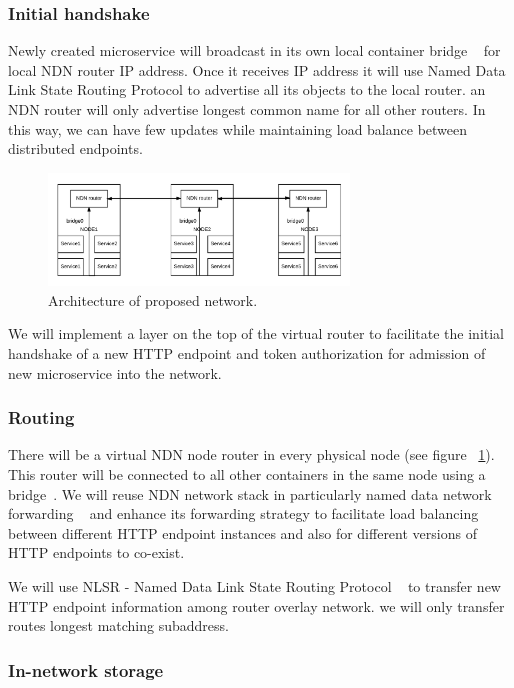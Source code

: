 \subsubsection{Initial handshake}

Newly created microservice will broadcast in its own local container bridge ~\cite{DockerNet} for local NDN router IP address. Once it receives IP address it will use Named Data Link State Routing Protocol to advertise all its objects to the local router. an NDN router will only advertise longest common name for all other routers. In this way, we can have few updates while maintaining load balance between distributed endpoints.

\begin{figure}
   \includegraphics[height=3cm, width=8cm]{figs/structural_diagram}
   \caption{Architecture of proposed network.}
   \label{fig:networkmodel}
\end{figure}

We will implement a layer on the top of the virtual router to facilitate the initial handshake of a new HTTP endpoint and token authorization for admission of new microservice into the network.

\subsubsection{Routing}

There will be a virtual NDN node router in every physical node (see figure ~\ref{fig:networkmodel}). This router will be connected to all other containers in the same node using a bridge~\cite{DockerNet}. We will reuse NDN network stack in particularly named data network forwarding ~\cite{yuan2012scalable} and enhance its forwarding strategy to facilitate load balancing between different HTTP endpoint instances and also for different versions of HTTP endpoints to co-exist.

We will use NLSR - Named Data Link State Routing Protocol ~\cite{hoque2013nlsr} to transfer new HTTP endpoint information among router overlay network. we will only transfer routes longest matching subaddress.

\subsubsection{In-network storage}

